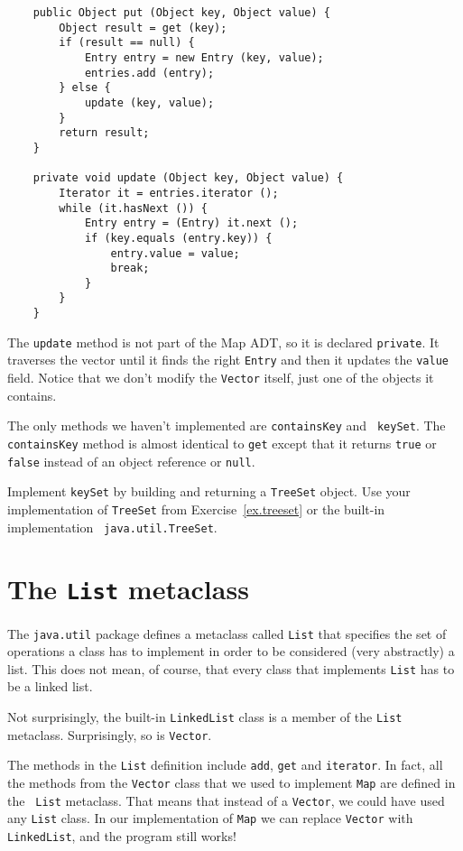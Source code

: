 \begin{verbatim}
    public Object put (Object key, Object value) {
        Object result = get (key);
        if (result == null) {
            Entry entry = new Entry (key, value);
            entries.add (entry);
        } else {
            update (key, value);
        }
        return result;
    }

    private void update (Object key, Object value) {
        Iterator it = entries.iterator ();
        while (it.hasNext ()) {
            Entry entry = (Entry) it.next ();
            if (key.equals (entry.key)) {
                entry.value = value;
                break;
            }
        }
    }
\end{verbatim}

The {\tt update} method is not part of the Map ADT, so
it is declared {\tt private}.  It traverses the vector until
it finds the right {\tt Entry} and then it updates
the {\tt value} field.  Notice that we don't modify
the {\tt Vector} itself, just one of the objects it contains.

The only methods we haven't implemented are {\tt containsKey} and {\tt
keySet}.  The {\tt containsKey} method is almost identical to {\tt get}
except that it returns {\tt true} or {\tt false} instead of an object
reference or {\tt null}.

\begin{exercise}
Implement {\tt keySet} by building and returning a {\tt TreeSet}
object.  Use your implementation of {\tt TreeSet} from
Exercise~\ref{ex.treeset} or the built-in implementation {\tt
java.util.TreeSet}.
\end{exercise}


\section{The {\tt List} metaclass}
 

The {\tt java.util} package defines a metaclass called
{\tt List} that specifies the set of operations a class has to
implement in order to be considered (very abstractly) a list.
This does not mean, of course, that every class that implements
{\tt List} has to be a linked list.

Not surprisingly, the built-in {\tt LinkedList} class is a member of
the {\tt List} metaclass.  Surprisingly, so is {\tt Vector}.

The methods in the {\tt List} definition include {\tt add}, {\tt get}
and {\tt iterator}.  In fact, all the methods from the {\tt Vector}
class that we used to implement {\tt Map} are defined in the {\tt
List} metaclass.  That means that instead of a {\tt Vector}, we could
have used any {\tt List} class.  In our implementation of {\tt Map} we
can replace {\tt Vector} with {\tt LinkedList}, and the program still
works!

